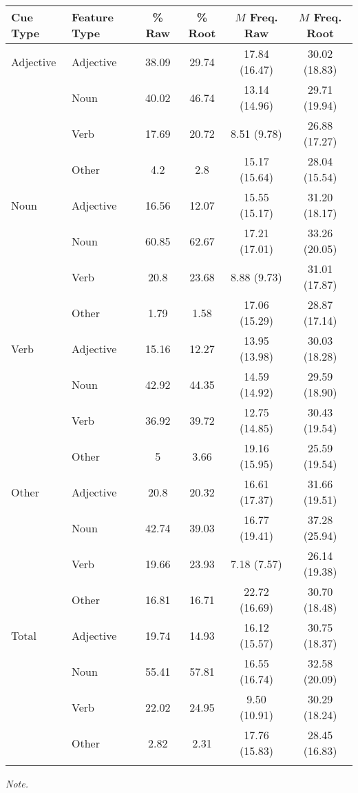 \documentclass[english,man]{apa6}
\theoremstyle{definition}
\theoremstyle{definition}
\theoremstyle{definition}
\theoremstyle{remark}
\begin{document}
\begin{table}[tbp]
\begin{center}
\begin{threeparttable}
\caption{\label{tab:percent-table}}
\begin{tabular}{llcccc}
\toprule
Cue Type & Feature Type & \% Raw & \% Root & $M$ Freq. Raw & $M$ Freq. Root\\
\midrule
Adjective & Adjective & 38.09 & 29.74 & 17.84 (16.47) & 30.02 (18.83)\\
 & Noun & 40.02 & 46.74 & 13.14 (14.96) & 29.71 (19.94)\\
 & Verb & 17.69 & 20.72 & 8.51 (9.78) & 26.88 (17.27)\\
 & Other & 4.2 & 2.8 & 15.17 (15.64) & 28.04 (15.54)\\
Noun & Adjective & 16.56 & 12.07 & 15.55 (15.17) & 31.20 (18.17)\\
 & Noun & 60.85 & 62.67 & 17.21 (17.01) & 33.26 (20.05)\\
 & Verb & 20.8 & 23.68 & 8.88 (9.73) & 31.01 (17.87)\\
 & Other & 1.79 & 1.58 & 17.06 (15.29) & 28.87 (17.14)\\
Verb & Adjective & 15.16 & 12.27 & 13.95 (13.98) & 30.03 (18.28)\\
 & Noun & 42.92 & 44.35 & 14.59 (14.92) & 29.59 (18.90)\\
 & Verb & 36.92 & 39.72 & 12.75 (14.85) & 30.43 (19.54)\\
 & Other & 5 & 3.66 & 19.16 (15.95) & 25.59 (19.54)\\
Other & Adjective & 20.8 & 20.32 & 16.61 (17.37) & 31.66 (19.51)\\
 & Noun & 42.74 & 39.03 & 16.77 (19.41) & 37.28 (25.94)\\
 & Verb & 19.66 & 23.93 & 7.18 (7.57) & 26.14 (19.38)\\
 & Other & 16.81 & 16.71 & 22.72 (16.69) & 30.70 (18.48)\\
Total & Adjective & 19.74 & 14.93 & 16.12 (15.57) & 30.75 (18.37)\\
 & Noun & 55.41 & 57.81 & 16.55 (16.74) & 32.58 (20.09)\\
 & Verb & 22.02 & 24.95 & 9.50 (10.91) & 30.29 (18.24)\\
 & Other & 2.82 & 2.31 & 17.76 (15.83) & 28.45 (16.83)\\
\bottomrule
\addlinespace
\end{tabular}
\begin{tablenotes}[para]
\textit{Note.} 
\end{tablenotes}
\end{threeparttable}
\end{center}
\end{table}
\end{document}
